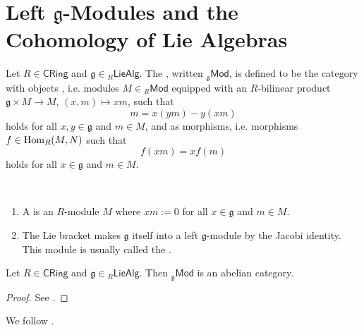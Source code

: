 \section*{Left $\mathfrak{g}$-Modules and the Cohomology of Lie Algebras}

\begin{definition}
	Let $R \in \mathsf{CRing}$ and $\mathfrak{g} \in {_{R}\mathsf{LieAlg}}$. The , written $_{\mathfrak{g}}\mathsf{Mod}$, is defined to be the category with objects , i.e. modules $M \in {_{R}}\mathsf{Mod}$ equipped with an $R$-bilinear product $\mathfrak{g} \times M \to M$, $(x,m) \mapsto xm$, such that 
	\begin{equation*}
		[x,y]m = x(ym) - y(xm)
	\end{equation*}
	\noindent holds for all $x,y \in \mathfrak{g}$ and $m \in M$, and  as morphisms, i.e. morphisms $f \in \operatorname{Hom}_R(M,N)$ such that 
	\begin{equation*}
		f(xm) = xf(m)
	\end{equation*}
	\noindent holds for all $x \in \mathfrak{g}$ and $m \in M$.
\end{definition}

\begin{examples}
	~
	\begin{enumerate}[label = \textup{(}\alph*\textup{)},wide=0pt]
		\item A  is an $R$-module $M$ where $xm := 0$ for all $x \in \mathfrak{g}$ and $m \in M$. 
		\item The Lie bracket makes $\mathfrak{g}$ itself into a left $\mathfrak{g}$-module by the Jacobi identity. This module is usually called the .
	\end{enumerate}
\end{examples}

\begin{proposition}
	Let $R \in \mathsf{CRing}$ and $\mathfrak{g} \in {_{R}\mathsf{LieAlg}}$. Then $_{\mathfrak{g}}\mathsf{Mod}$ is an abelian category.
\end{proposition}

\begin{proof}
	See \cite[220]{weibel:homological_algebra:1994}.
\end{proof}

We follow \cite[178]{kashiwara:categories:2006}.

